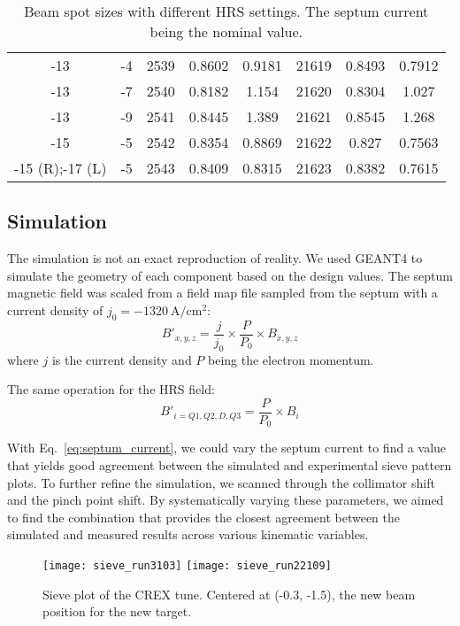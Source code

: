\begin{table}[h!]
\begin{tabular}{c c | c c c | c c c}
	-13 & -4    & 2539  & 0.8602	& 0.9181    & 21619	& 0.8493    & 0.7912  \\
	-13 & -7    & 2540  & 0.8182	& 1.154	    & 21620	& 0.8304    & 1.027   \\
	-13 & -9    & 2541  & 0.8445	& 1.389	    & 21621	& 0.8545    & 1.268   \\
	-15 & -5    & 2542  & 0.8354	& 0.8869    & 21622	& 0.827	    & 0.7563  \\
	\hline
	-15 (R);-17 (L)	& -5	&2543	& 0.8409	& 0.8315  & 21623 & 0.8382	& 0.7615  \\
	\hline
    \end{tabular}
    \caption{Beam spot sizes with different HRS settings. The septum current being 
    the nominal value.}
\end{table}

\subsection{Simulation}
The simulation is not an exact reproduction of reality. We used GEANT4 to
simulate the geometry of each component based on the design values. The
septum magnetic field was scaled from a field map file sampled from the septum
with a current density of $j_0 = -1320\ \mathrm{A}/\mathrm{cm}^2$: %
\begin{equation}
    B'_{x,y,z} = \frac{j}{j_0} \times \frac{P}{P_0} \times B_{x,y,z}
    \label{eq:septum_current}
\end{equation}
where $j$ is the current density and $P$ being the electron momentum.

The same operation for the HRS field: %
\begin{equation}
    B'_{i = Q1, Q2, D, Q3} = \frac{P}{P_0} \times B_i
\end{equation}

With Eq.~\ref{eq:septum_current}, we could vary the septum current to find a value
that yields good agreement between the simulated and experimental sieve pattern plots.
To further refine the simulation, we scanned through the collimator shift and 
the pinch point shift. By systematically varying these parameters, we aimed to find the combination that provides the closest agreement between the simulated and measured results across various kinematic variables.

\begin{figure}[H]
    \texttt{[image: sieve\_run3103]}
    \texttt{[image: sieve\_run22109]}
    \caption{Sieve plot of the CREX tune. Centered at (-0.3, -1.5), the new beam 
    position for the new target.}
\end{figure}

